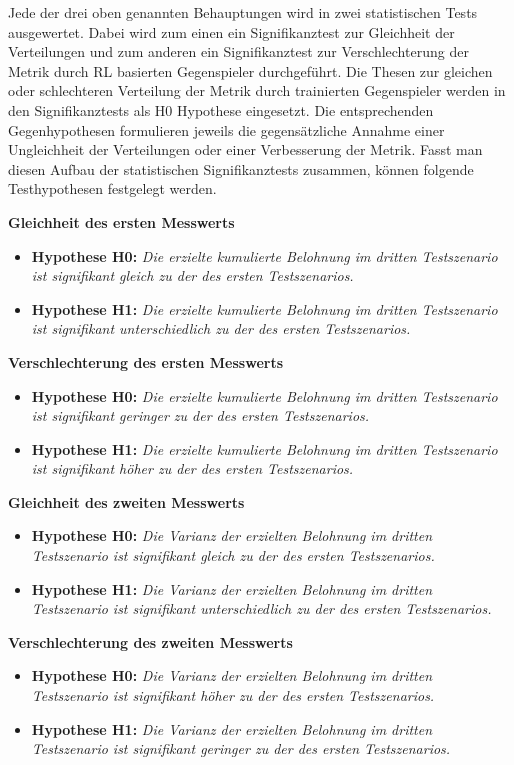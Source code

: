 Jede der drei oben genannten Behauptungen wird in zwei statistischen Tests ausgewertet.
Dabei wird zum einen ein Signifikanztest zur Gleichheit der Verteilungen und zum anderen ein Signifikanztest zur Verschlechterung der Metrik durch RL basierten Gegenspieler durchgeführt.
Die Thesen zur gleichen oder schlechteren Verteilung der Metrik durch trainierten Gegenspieler werden in den Signifikanztests als H0 Hypothese eingesetzt.
Die entsprechenden Gegenhypothesen formulieren jeweils die gegensätzliche Annahme einer Ungleichheit der Verteilungen oder einer Verbesserung der Metrik. 
Fasst man diesen Aufbau der statistischen Signifikanztests zusammen, können folgende Testhypothesen festgelegt werden. 

\textbf{Gleichheit des ersten Messwerts}
\begin{itemize}
    \item \textbf{Hypothese H0:} \textit{Die erzielte kumulierte Belohnung im dritten Testszenario ist signifikant gleich zu der des ersten Testszenarios.}
    \item \textbf{Hypothese H1:} \textit{Die erzielte kumulierte Belohnung im dritten Testszenario ist signifikant unterschiedlich zu der des ersten Testszenarios.}
\end{itemize}

\textbf{Verschlechterung des ersten Messwerts}
\begin{itemize}
    \item \textbf{Hypothese H0:} \textit{Die erzielte kumulierte Belohnung im dritten Testszenario ist signifikant geringer zu der des ersten Testszenarios.}
    \item \textbf{Hypothese H1:} \textit{Die erzielte kumulierte Belohnung im dritten Testszenario ist signifikant höher zu der des ersten Testszenarios.}
\end{itemize}

\textbf{Gleichheit des zweiten Messwerts}
\begin{itemize}
    \item \textbf{Hypothese H0:} \textit{Die Varianz der erzielten Belohnung im dritten Testszenario ist signifikant gleich zu der des ersten Testszenarios.}
    \item \textbf{Hypothese H1:} \textit{Die Varianz der erzielten Belohnung im dritten Testszenario ist signifikant unterschiedlich zu der des ersten Testszenarios.}
\end{itemize}

\textbf{Verschlechterung des zweiten Messwerts}
\begin{itemize}
    \item \textbf{Hypothese H0:} \textit{Die Varianz der erzielten Belohnung im dritten Testszenario ist signifikant höher zu der des ersten Testszenarios.}
    \item \textbf{Hypothese H1:} \textit{Die Varianz der erzielten Belohnung im dritten Testszenario ist signifikant geringer zu der des ersten Testszenarios.}
\end{itemize}


